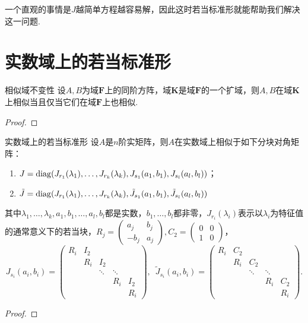 一个直观的事情是$J$越简单方程越容易解，因此这时若当标准形就能帮助我们解决这一问题.

\section{实数域上的若当标准形} \label{sec:实数域上的若当标准形}

\begin{theorem}{}{相似域不变性}
    设$A,B$为域$\mathbf{F}$上的同阶方阵，域$\mathbf{K}$是域$\mathbf{F}$的一个扩域，则$A,B$在域$\mathbf{K}$上相似当且仅当它们在域$\mathbf{F}$上也相似.
\end{theorem}
\begin{proof}

\end{proof}

\begin{theorem}{}{实数域上的若当标准形}
    设$A$是$n$阶实矩阵，则$A$在实数域上相似于如下分块对角矩阵：
    \begin{enumerate}
        \item $J=\operatorname{diag}(J_{r_1}(\lambda_1),\ldots,J_{r_k}(\lambda_k),J_{s_1}(a_1,b_1),J_{s_l}(a_l,b_l))$；
        \item $\tilde{J}=\operatorname{diag}(J_{r_1}(\lambda_1),\ldots,J_{r_k}(\lambda_k),\tilde{J}_{s_1}(a_1,b_1),\tilde{J}_{s_l}(a_l,b_l))$
    \end{enumerate}
    其中$\lambda_1,\ldots,\lambda_k,a_1,b_1,\ldots,a_l,b_l$都是实数，$b_1,\ldots,b_l$都非零，$J_{r_i}(\lambda_i)$表示以$\lambda_i$为特征值的通常意义下的若当块，$R_j=\begin{pmatrix}
            a_j & b_j \\ -b_j & a_j
        \end{pmatrix},C_2=\begin{pmatrix}
            0 & 0 \\ 1 & 0
        \end{pmatrix}$，
    \[J_{s_i}(a_i,b_i)=\begin{pmatrix}
            R_i & I_2 &        &        &     \\
                & R_i & I_2    &        &     \\
                &     & \ddots & \ddots &     \\
                &     &        & R_i    & I_2 \\
                &     &        &        & R_i
        \end{pmatrix},\enspace \tilde{J}_{s_i}(a_i,b_i)=\begin{pmatrix}
            R_i & C_2 &        &        &     \\
                & R_i & C_2    &        &     \\
                &     & \ddots & \ddots &     \\
                &     &        & R_i    & C_2 \\
                &     &        &        & R_i
        \end{pmatrix}.\]
\end{theorem}
\begin{proof}

\end{proof}

